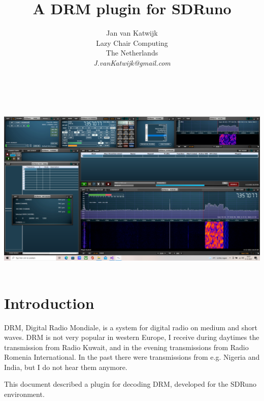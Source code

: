 \documentclass[10pt]{article}
\begin{document}
\title{A DRM plugin for SDRuno}
\author{
Jan van Katwijk\\
Lazy Chair Computing \\
The Netherlands\\
{\em J.vanKatwijk@gmail.com}}
\maketitle
\ \\
\ \\
\includegraphics[width=160mm]{drm-decoder.png}
\ \\
\section{Introduction}
DRM, Digital Radio Mondiale, is a system for digital radio on medium and
short waves.
DRM is not very popular in western Europe, I receive during daytimes the
transmission from Radio Kuwait, and in the evening transmissions from
Radio Romenia International.
In the past there were transmissions from e.g. Nigeria and India,
but I do not hear them anymore.

This document described a plugin for decoding DRM,
developed for the SDRuno environment.
\end{document}
